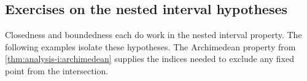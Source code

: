 

\subsection{Exercises on the nested interval hypotheses}
Closedness and boundedness each do work in the nested interval property.
The following examples isolate these hypotheses. The Archimedean property
from \autoref{thm:analysis-i:archimedean} supplies the indices needed
to exclude any fixed point from the intersection.



